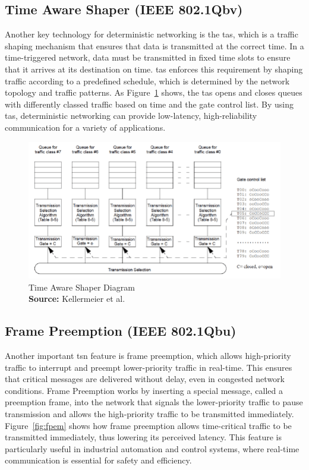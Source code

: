 \documentclass[runningheads]{llncs}
\newcommand*{\captionsource}[2]{%
  \caption[{#1}]{%
    #1%
    \\\hspace{\linewidth}%
    \textbf{Source:} #2%
  }%
}
\begin{document}
\subsection*{Time Aware Shaper (IEEE 802.1Qbv)}
Another key technology for deterministic networking is the \gls{tas}, which is a traffic shaping mechanism that ensures that data is transmitted at the correct time. In a time-triggered network, data must be transmitted in fixed time slots to ensure that it arrives at its destination on time. \gls{tas} enforces this requirement by shaping traffic according to a predefined schedule, which is determined by the network topology and traffic patterns. As Figure~\ref{fig:tas} shows, the \gls{tas} opens and closes queues with differently classed traffic based on time and the gate control list. By using \gls{tas}, deterministic networking can provide low-latency, high-reliability communication for a variety of applications.

\begin{figure}
  \centering
  \includegraphics[width=\linewidth]{tas}
  \captionsource{Time Aware Shaper Diagram}{Kellermeier et al.~\cite{Kellermeier2018}}
  \label{fig:tas}
\end{figure}

\subsection*{Frame Preemption (IEEE 802.1Qbu)}
Another important \gls{tsn} feature is frame preemption, which allows high-priority traffic to interrupt and preempt lower-priority traffic in real-time. This ensures that critical messages are delivered without delay, even in congested network conditions. Frame Preemption works by inserting a special message, called a preemption frame, into the network that signals the lower-priority traffic to pause transmission and allows the high-priority traffic to be transmitted immediately. Figure~\ref{fig:fpem} shows how frame preemption allows time-critical traffic to be transmitted immediately, thus lowering its perceived latency. This feature is particularly useful in industrial automation and control systems, where real-time communication is essential for safety and efficiency.
\end{document}

